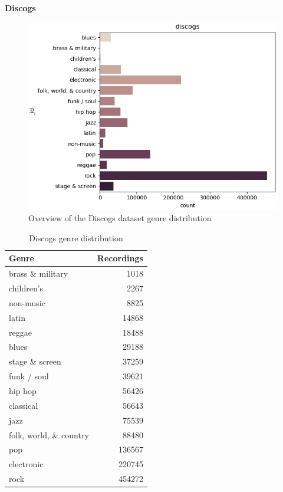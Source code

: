 \textbf{Discogs}
\begin{figure}[th]
    \centering
    \includegraphics[width=1.0\textwidth]{Figures/discogs_dist.png}
    \decoRule
    \caption[Discogs distribution]{Overview of the Discogs dataset genre distribution}
    \label{fig:discogsdistfig}
\end{figure}
\begin{table}[!ht]
    \centering
    \begin{tabular}{l r} 
        \hline
        Genre & Recordings \\ [0.5ex] 
        \hline
        brass \& military & 1018 \\
        children's & 2267 \\
        non-music & 8825 \\
        latin & 14868 \\
        reggae & 18488 \\
        blues & 29188 \\
        stage \& screen & 37259 \\
        funk / soul & 39621 \\
        hip hop & 56426 \\
        classical & 56643 \\
        jazz & 75539 \\
        folk, world, \& country & 88480 \\
        pop & 136567 \\
        electronic & 220745 \\
        rock & 454272 \\
        \hline
    \end{tabular}
    \caption{Discogs genre distribution}
    \label{table:discogsdist}
\end{table}

